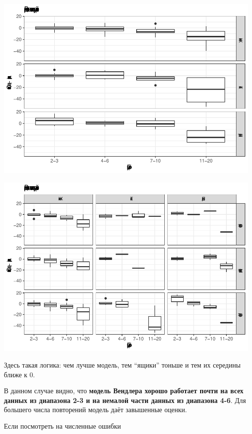 \documentclass[
]{article}
\begin{document}
\begin{center}\includegraphics{Regression-model-for-estimating-RM_files/figure-latex/unnamed-chunk-28-2} \end{center}

\begin{center}\includegraphics{Regression-model-for-estimating-RM_files/figure-latex/unnamed-chunk-28-3} \end{center}

Здесь такая логика: чем лучше модель, тем ``ящики'' тоньше и тем их
середины ближе к 0.

В данном случае видно, что \textbf{модель Вендлера хорошо работает почти
на всех данных из диапазона 2-3 и на немалой части данных из диапазона
4-6}. Для большего числа повторений модель даёт завышенные оценки.

Если посмотреть на численные ошибки
\end{document}
